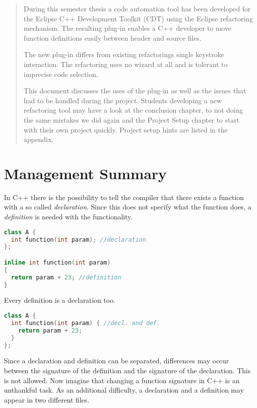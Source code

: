 \begin{abstract}

During this semester thesis a code automation tool has been developed for the 
Eclipse C++ Development Toolkit (CDT) using the Eclipse refactoring mechanism. 
The resulting plug-in enables a C++ developer to move function definitions easily 
between header and source files.

The new plug-in differs from existing refactorings single keystroke interaction. The
refactoring uses no wizard at all and is tolerant to imprecise code selection.

This document discusses the uses of the plug-in as well as the issues that had 
to be handled during the project. Students developing a new refactoring tool
may have a look at the conclusion chapter, to not doing the same mistakes we
did again and the Project Setup chapter to start with their own project quickly.
Project setup hints are listed in the appendix.
\end{abstract}

\chapter*{Management Summary}

In C++ there is the possibility to tell the compiler that there exists a
function with a so called \textit{declaration}. Since
this does not specify what the function does, a \textit{definition} is needed
with the functionality.

\begin{lstlisting}[caption={class with declaration and separated definition},
label={declanddef}, language=C++]
class A {
  int function(int param); //declaration
};

inline int function(int param)
{
  return param + 23; //definition
}
\end{lstlisting}

Every definition is a declaration too.

\begin{lstlisting}[caption={class with declaration and definition},
label={defonly}, language=C++]
class A {
  int function(int param) { //decl. and def.
    return param + 23;
  }
};
\end{lstlisting}

Since a declaration and definition can be separated, differences may occur
between the signature of the definition and the signature of the declaration.
This is not allowed. 
Now imagine that changing a function signature in C++ is an unthankful task.
As an additional difficulty, a declaration and a definition may appear in two
different files.

